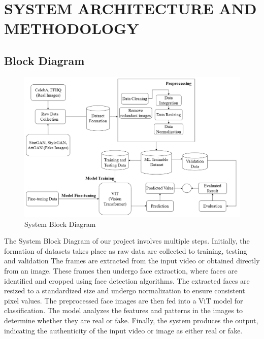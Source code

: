 \section{SYSTEM ARCHITECTURE AND METHODOLOGY }
\subsection{Block Diagram}
\begin{figure}[h]
    \centering
    \includegraphics[width= 6in ]{img/Model_ArchitectureV2.drawio.png}
    \caption{{System Block Diagram}}

\end{figure}
\justify
The System Block Diagram of our project involves multiple steps. Initially, the formation of datasets takes place as raw data are collected to training, testing and validation  The frames are extracted from the input video or obtained directly from an image. These frames then undergo face extraction, where faces are identified and cropped using face detection algorithms. The extracted faces are resized to a standardized size and undergo normalization to ensure consistent pixel values. The preprocessed face images are then fed into a ViT model for classification. The model analyzes the features and patterns in the images to determine whether they are real or fake. Finally, the system produces the output, indicating the authenticity of the input video or image as either real or fake.
